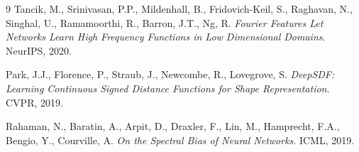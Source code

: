 \documentclass[12pt, a4paper]{article}
\begin{document}
\begin{thebibliography}{9}
  Tancik, M., Srinivasan, P.P., Mildenhall, B., Fridovich-Keil, S., Raghavan, N., Singhal, U., Ramamoorthi, R., Barron, J.T., Ng, R.
  \textit{Fourier Features Let Networks Learn High Frequency Functions in Low Dimensional Domains}.
  NeurIPS, 2020.

  Park, J.J., Florence, P., Straub, J., Newcombe, R., Lovegrove, S.
  \textit{DeepSDF: Learning Continuous Signed Distance Functions for Shape Representation}.
  CVPR, 2019.

  Rahaman, N., Baratin, A., Arpit, D., Draxler, F., Lin, M., Hamprecht, F.A., Bengio, Y., Courville, A.
  \textit{On the Spectral Bias of Neural Networks}.
  ICML, 2019.
\end{thebibliography}
\end{document}

